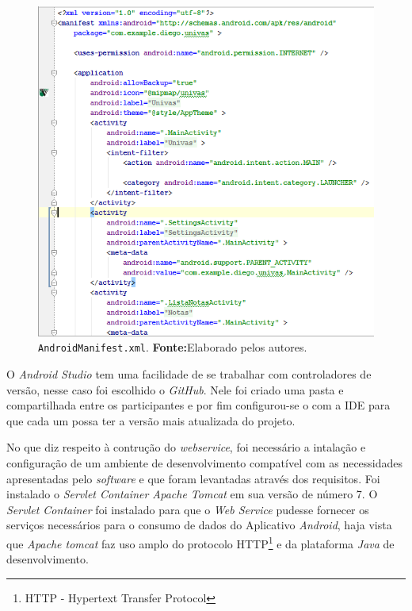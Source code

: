 	\begin{figure}[h!]
			\centerline{\includegraphics[scale=0.5]{./imagens/imagem10.png}}
			\caption[\texttt{AndroidManifest.xml}]{\texttt{AndroidManifest.xml}.
			 \textbf{Fonte:}Elaborado pelos autores.}
			\label{fig:exemplo10}
		\end{figure}

	\par O \textit{Android Studio} tem uma facilidade de se trabalhar com
controladores de versão, nesse caso foi escolhido o \textit{GitHub}. Nele foi
criado uma pasta e compartilhada entre os participantes e por fim configurou-se
o  com a IDE para que cada um possa ter a versão mais atualizada do
projeto.
	
	\pagebreak
	\par No que diz respeito à contrução do \textit{webservice}, foi necessário a
intalação e configuração de um ambiente de desenvolvimento compatível com as
necessidades apresentadas pelo \textit{software} e que foram levantadas através
dos requisitos. Foi instalado o \textit{Servlet Container Apache Tomcat} em sua
versão de número 7. O \textit{Servlet Container} foi instalado para que o
\textit{Web Service} pudesse fornecer os serviços necessários para o consumo de
dados do Aplicativo \textit{Android}, haja vista que \textit{Apache tomcat} faz
uso amplo do protocolo HTTP\footnote{HTTP - Hypertext Transfer Protocol} e da
plataforma \textit{Java} de desenvolvimento.
			

